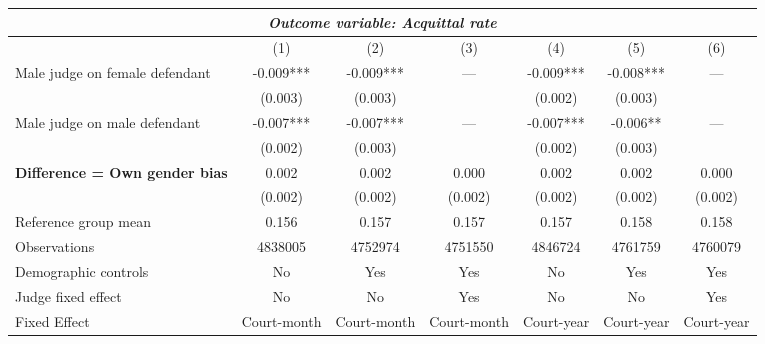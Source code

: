 {
\def\sym#1{\ifmmode^{#1}\else\(^{#1}\)\fi}
\begin{tabular}{l*{6}{c}}
  \hline\hline
\multicolumn{7}{c}{\textit{Outcome variable: Acquittal rate}}\\
\hline
&\multicolumn{1}{c}{(1)}&\multicolumn{1}{c}{(2)}&\multicolumn{1}{c}{(3)}&\multicolumn{1}{c}{(4)}&\multicolumn{1}{c}{(5)}&\multicolumn{1}{c}{(6)}\\
\hline
Male judge on female defendant \hspace{15mm} & -0.009*** & -0.009*** & --- & -0.009*** & -0.008*** & --- \\
& (0.003) & (0.003) &  & (0.002) &(0.003) &  \\
Male judge on male defendant \hspace{15mm} & -0.007*** & -0.007*** & ---& -0.007*** & -0.006** & --- \\
& (0.002) & (0.003) &  & (0.002) & (0.003) &  \\
\textbf{Difference = Own gender bias} \hspace{15mm} & 0.002 & 0.002 & 0.000 & 0.002 & 0.002 & 0.000 \\
& (0.002) & (0.002) & (0.002) & (0.002) & (0.002) & (0.002) \\
\hline
Reference group mean & 0.156 & 0.157 & 0.157 & 0.157 & 0.158 & 0.158 \\
Observations & 4838005 & 4752974 & 4751550 & 4846724 & 4761759 & 4760079 \\
Demographic controls & No & Yes & Yes & No & Yes & Yes \\
Judge fixed effect & No & No & Yes & No & No & Yes \\
Fixed Effect & Court-month & Court-month & Court-month & Court-year & Court-year & Court-year \\
\hline\hline
\end{tabular}
}
 
